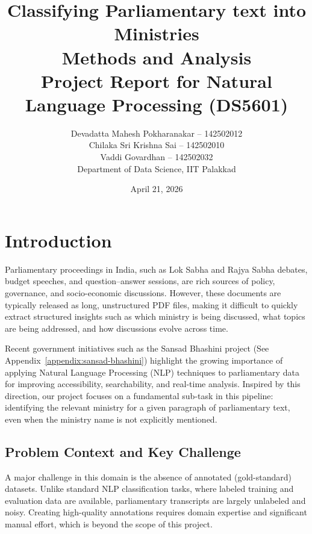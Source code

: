 \documentclass{report}
\begin{document}
\sloppy

\title{\textbf{Classifying Parliamentary text into Ministries \\[1ex] \Large Methods and Analysis }\\[3ex] Project Report for Natural Language Processing (DS5601)}

\author{
    Devadatta Mahesh Pokharanakar -- 142502012 \\
    Chilaka Sri Krishna Sai -- 142502010 \\
    Vaddi Govardhan -- 142502032 \\
    [2ex] Department of Data Science, IIT Palakkad
}

\date{April 21, 2026}

\maketitle
\tableofcontents
\newpage

\section{Introduction}
Parliamentary proceedings in India, such as Lok Sabha and Rajya Sabha debates, budget speeches, and question–answer sessions, are rich sources of policy, governance, and socio-economic discussions. However, these documents are typically released as long, unstructured PDF files, making it difficult to quickly extract structured insights such as which ministry is being discussed, what topics are being addressed, and how discussions evolve across time\cite{Katre2019}\cite{Rohit2018}.

Recent government initiatives such as the Sansad Bhashini project (See Appendix~\ref{appendix:sansad-bhashini}) highlight the growing importance of applying Natural Language Processing (NLP) techniques to parliamentary data for improving accessibility, searchability, and real-time analysis. Inspired by this direction, our project focuses on a fundamental sub-task in this pipeline: identifying the relevant ministry for a given paragraph of parliamentary text, even when the ministry name is not explicitly mentioned.

\subsection{Problem Context and Key Challenge}
A major challenge in this domain is the absence of annotated (gold-standard) datasets. Unlike standard NLP classification tasks, where labeled training and evaluation data are available, parliamentary transcripts are largely unlabeled and noisy. Creating high-quality annotations requires domain expertise and significant manual effort, which is beyond the scope of this project.
\end{document}
